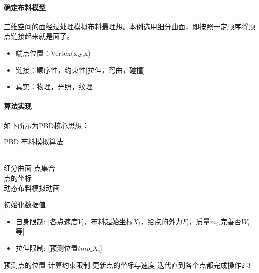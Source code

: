 \documentclass[UTF8,a4paper,8pt]{ctexart}
\begin{document}
		\paragraph{确定布料模型}三维空间的面经过处理模拟布料最理想。本例选用细分曲面，即按照一定顺序将顶点链接起来就是面了。
			\begin{itemize}
				\item  端点位置：Vertex(x,y,x)
				\item  链接：顺序性，约束性[拉伸，弯曲，碰撞]
				\item  真实：物理，光照，纹理
			\end{itemize}
		
		\paragraph{算法实现}如下所示为PBD核心思想：
			\begin{algorithm}[htb]
				\caption{PBD 布料模拟算法}
				\label{alg:Cloth_Simulation_PBD}
				\begin{algorithmic}[1]
					\REQUIRE ~~\\ 
					细分曲面-点集合 \\
					点的坐标
					\ENSURE ~~\\
					动态布料模拟动画
					
					\STATE 初始化数据值
							\begin{itemize}
								\item   自身限制: [各点速度$V_i$，布料起始坐标$X_i$，给点的外力$F_i$，质量$m_i$,完善否$W_i$等]
								
								\item 拉伸限制: [预测位置$tmp\_X_i$]
							\end{itemize}
					\STATE 预测点的位置
					\STATE 计算约束限制
					\STATE 更新点的坐标与速度 
					\STATE 迭代直到各个点都完成操作2-3
				\end{algorithmic}
			\end{algorithm}
\end{document}
